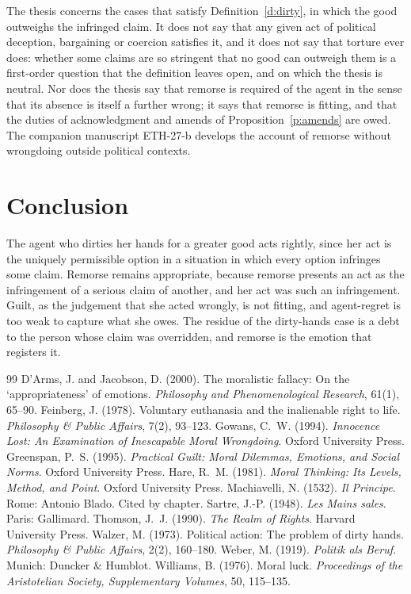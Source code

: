 \documentclass{situationist-preprint}
\begin{document}
The thesis concerns the cases that satisfy Definition~\ref{d:dirty}, in which the good outweighs the infringed claim. It does not say that any given act of political deception, bargaining or coercion satisfies it, and it does not say that torture ever does: whether some claims are so stringent that no good can outweigh them is a first-order question that the definition leaves open, and on which the thesis is neutral. Nor does the thesis say that remorse is required of the agent in the sense that its absence is itself a further wrong; it says that remorse is fitting, and that the duties of acknowledgment and amends of Proposition~\ref{p:amends} are owed. The companion manuscript ETH-27-b develops the account of remorse without wrongdoing outside political contexts.

\section{Conclusion}

The agent who dirties her hands for a greater good acts rightly, since her act is the uniquely permissible option in a situation in which every option infringes some claim. Remorse remains appropriate, because remorse presents an act as the infringement of a serious claim of another, and her act was such an infringement. Guilt, as the judgement that she acted wrongly, is not fitting, and agent-regret is too weak to capture what she owes. The residue of the dirty-hands case is a debt to the person whose claim was overridden, and remorse is the emotion that registers it.

\begin{thebibliography}{99}\small
{} D'Arms, J. and Jacobson, D. (2000). The moralistic fallacy: On the `appropriateness' of emotions. \emph{Philosophy and Phenomenological Research}, 61(1), 65--90.
 Feinberg, J. (1978). Voluntary euthanasia and the inalienable right to life. \emph{Philosophy \& Public Affairs}, 7(2), 93--123.
 Gowans, C.~W. (1994). \emph{Innocence Lost: An Examination of Inescapable Moral Wrongdoing}. Oxford University Press.
 Greenspan, P.~S. (1995). \emph{Practical Guilt: Moral Dilemmas, Emotions, and Social Norms}. Oxford University Press.
 Hare, R.~M. (1981). \emph{Moral Thinking: Its Levels, Method, and Point}. Oxford University Press.
 Machiavelli, N. (1532). \emph{Il Principe}. Rome: Antonio Blado. Cited by chapter.
 Sartre, J.-P. (1948). \emph{Les Mains sales}. Paris: Gallimard.
 Thomson, J.~J. (1990). \emph{The Realm of Rights}. Harvard University Press.
 Walzer, M. (1973). Political action: The problem of dirty hands. \emph{Philosophy \& Public Affairs}, 2(2), 160--180.
 Weber, M. (1919). \emph{Politik als Beruf}. Munich: Duncker \& Humblot.
 Williams, B. (1976). Moral luck. \emph{Proceedings of the Aristotelian Society, Supplementary Volumes}, 50, 115--135.
\end{thebibliography}
\end{document}
